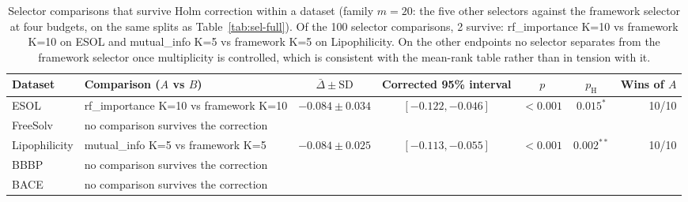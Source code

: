 \begin{table}[H]
\caption{Selector comparisons that survive Holm correction within a dataset (family $m=20$: the five other selectors against the framework selector at four budgets, on the same splits as Table~\ref{tab:sel-full}). Of the 100 selector comparisons, 2 survive: rf_importance K=10 vs framework K=10 on ESOL and mutual_info K=5 vs framework K=5 on Lipophilicity. On the other endpoints no selector separates from the framework selector once multiplicity is controlled, which is consistent with the mean-rank table rather than in tension with it.}\label{tab:selector-stats}
\centering\scriptsize
\setlength{\tabcolsep}{4pt}
\begin{tabular}{@{}llccccr@{}}
\toprule
Dataset & Comparison ($A$ vs $B$) & $\bar\Delta\pm\mathrm{SD}$ & Corrected 95\% interval & $p$ & $p_{\mathrm{H}}$ & Wins of $A$ \\
\midrule
ESOL & rf_importance K=10 vs framework K=10 & $-0.084\pm0.034$ & $[-0.122,-0.046]$ & $<0.001$ & $0.015^{*}$ & 10/10 \\
FreeSolv & \multicolumn{6}{l}{no comparison survives the correction} \\
Lipophilicity & mutual_info K=5 vs framework K=5 & $-0.084\pm0.025$ & $[-0.113,-0.055]$ & $<0.001$ & $0.002^{**}$ & 10/10 \\
BBBP & \multicolumn{6}{l}{no comparison survives the correction} \\
BACE & \multicolumn{6}{l}{no comparison survives the correction} \\
\bottomrule
\end{tabular}
\end{table}
